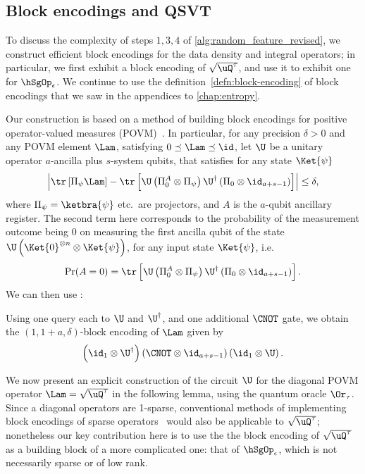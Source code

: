 \subsection*{Block encodings and QSVT}
To discuss the complexity of steps $1, 3, 4$ of \cref{alg:random_feature_revised}, we construct efficient block encodings for the data density and integral operators; in particular, we first exhibit a block encoding of $\sqrt{\uQ^{\tau}}$,
and use it to exhibit one for $\hSgOp_\epsilon$.
We continue to use the definition~\cref{defn:block-encoding} of block encodings that we saw in the appendices to \cref{chap:entropy}.

Our construction is based on a method of building block encodings for positive operator-valued measures (POVM)~\cite{Gilyen2018QuantumArithmetics}.
In particular, for any precision $\delta>0$ and any POVM element $\Lam$, satisfying $0\preceq \Lam\preceq\id$, let $\U$ be a unitary operator $a$-ancilla plus $s$-system qubits, that satisfies for any state $\Ket{\psi}$
\begin{equation}
  \label{eq:povm_implementation}
  \left|\tr\left[\Pi_{\psi}\Lam\right]-\tr\left[\U\left(\Pi_0 ^A\otimes \Pi_{\psi}\right)\U^\dag\left(\Pi_0\otimes\id_{a+s-1}\right)\right]\right|\leq \delta,
\end{equation}
where $\Pi_\psi=\ketbra{\psi}$ etc.\ are projectors, and $A$ is the $a$-qubit ancillary register.
The second term here corresponds to the probability of the measurement outcome being $0$ on measuring the first ancilla qubit of the state $\U\left(\Ket{0}^{\otimes n}\otimes\Ket{\psi}\right)$, for any input state $\Ket{\psi}$, i.e.\
\begin{equation}
  \Pr(A=0)=\tr\left[\U\left(\Pi_0 ^A \otimes\Pi_{\psi}\right)\U^\dag\left(\Pi_0\otimes\id_{a+s-1}\right)\right].
\end{equation}
We can then use \cite[Lemma 49]{Gilyen2018QuantumArithmetics}:
\begin{lemma*} %
  Using one query each to $\U$ and $\U^\dag$, and one additional $\CNOT$ gate, we obtain the $\left(1,1+a,\delta\right)$-block encoding of $\Lam$ given by 
  \[\left(\id_1\otimes \U^{\dagger}\right)\left(\CNOT\otimes \id_{a+s-1}\right)\left(\id_1\otimes \U\right).\]
\end{lemma*}
We now present an explicit construction of the circuit $\U$ for the diagonal POVM operator $\Lam=\sqrt{\uQ^{\tau}}$ in the following lemma, using the quantum oracle $\Or_\tau$. 
Since a diagonal operators are 1-sparse, conventional methods of implementing block encodings of sparse operators~\cite{Gilyen2018QuantumArithmetics} would also be applicable to $\sqrt{\uQ^{\tau}}$; nonetheless our key contribution here is to use the the block encoding of $\sqrt{\uQ^{\tau}}$ as a building block of a more complicated one: that of $\hSgOp_\epsilon$, which is not necessarily sparse or of low rank.
